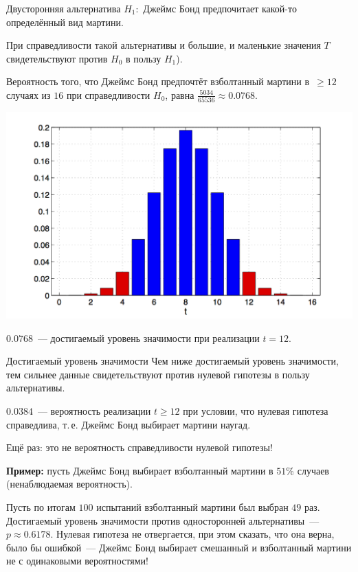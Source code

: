 \documentclass[9pt,pdf,utf8,hyperref={unicode},aspectratio=169]{beamer}
\begin{document}
\begin{frame}{Двусторонняя альтернатива}
% 
	$H_1\colon$ Джеймс Бонд предпочитает какой-то определённый вид мартини.
	
	При справедливости такой альтернативы и большие, и маленькие значения $T$ свидетельствуют против $H_0$ в пользу $H_1$).
	
	Вероятность того, что Джеймс Бонд предпочтёт взболтанный мартини в~$\geq 12$ случаях из $16$ при справедливости $H_0$, равна $\frac{5034}{65536}\approx 0.0768$.
	\begin{center}
		\includegraphics[height=0.6\textheight]{bond3.png}
	\end{center}
	$0.0768$~--- достигаемый уровень значимости при реализации $t=12$.
\end{frame}

\begin{frame}{Достигаемый уровень значимости}
% 
		Чем ниже достигаемый уровень значимости, тем сильнее данные свидетельствуют против нулевой гипотезы в пользу альтернативы.
		
		\bigskip
		
		$0.0384$~--- вероятность реализации $t\geq 12$ при условии, что нулевая гипотеза справедлива, т.\,е. Джеймс Бонд выбирает мартини наугад.
		
		\bigskip
		
		Ещё раз: это не вероятность справедливости нулевой гипотезы!
		
\bigskip

		\textbf{Пример:} пусть Джеймс Бонд выбирает взболтанный мартини в $51$\% случаев (ненаблюдаемая вероятность).
		
		\bigskip
		
		Пусть по итогам $100$ испытаний взболтанный мартини был выбран $49$ раз. Достигаемый уровень значимости против односторонней альтернативы~--- $p\approx 0.6178.$
		Нулевая гипотеза не отвергается, при этом сказать, что она верна, было бы ошибкой~--- Джеймс Бонд выбирает смешанный и взболтанный мартини не с одинаковыми вероятностями!
\end{frame}
\end{document}
